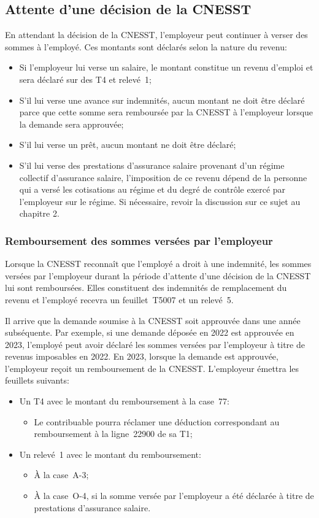 \subsection{Attente d'une décision de la CNESST}
En attendant la décision de la CNESST, l'employeur peut continuer à verser des sommes à l'employé. Ces montants sont déclarés selon la nature du revenu:
\begin{itemize}
	\item Si l'employeur lui verse un salaire, le montant constitue un revenu d'emploi et sera déclaré sur des T4 et relevé~1;
	\item S'il lui verse une avance sur indemnités, aucun montant ne doit être déclaré parce que cette somme sera remboursée par la CNESST à l'employeur lorsque la demande sera approuvée;
	\item S'il lui verse un prêt, aucun montant ne doit être déclaré;
	\item S'il lui verse des prestations d'assurance salaire provenant d'un régime collectif d'assurance salaire, l'imposition de ce revenu dépend de la personne qui a versé les cotisations au régime et du degré de contrôle exercé par l'employeur sur le régime. Si nécessaire, revoir la discussion sur ce sujet au chapitre 2.
\end{itemize}

\subsubsection{Remboursement des sommes versées par l'employeur}
Lorsque la CNESST reconnaît que l'employé a droit à une indemnité, les sommes versées par l'employeur durant la période d'attente d'une décision de la CNESST lui sont remboursées. Elles constituent des indemnités de remplacement du revenu et l'employé recevra un feuillet~T5007 et un relevé~5. 

Il arrive que la demande soumise à la CNESST soit approuvée dans une année subséquente. Par exemple, si une demande déposée en 2022 est approuvée en 2023, l'employé peut avoir déclaré les sommes versées par l'employeur à titre de revenus imposables en 2022. En 2023, lorsque la demande est approuvée, l'employeur reçoit un remboursement de la CNESST. L'employeur émettra les feuillets suivants:

\begin{itemize}[label=]
	\item Un T4 avec le montant du remboursement à la case~77:
	\begin{itemize}
		\item Le contribuable pourra réclamer une déduction correspondant au remboursement à la ligne~22900 de sa T1;
	\end{itemize}
	\item Un relevé~1 avec le montant du remboursement:
	\begin{itemize}
		\item À la case~A-3;
		\item À la case~O-4, si la somme versée par l'employeur a été déclarée à titre de prestations d'assurance salaire.
	\end{itemize}
\end{itemize}

